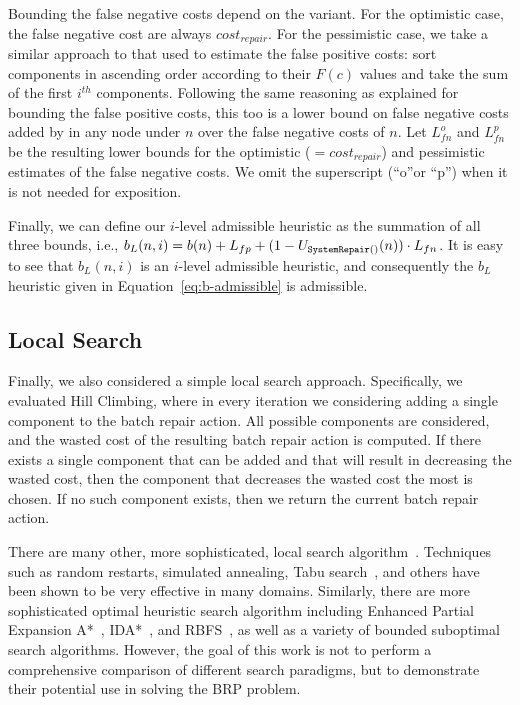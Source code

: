 \documentclass[review]{elsarticle}
\newcommand\sysrep[1]{{\tt SystemRepair(#1)}}
\begin{document}
Bounding the false negative costs depend on the \brps{} variant. For the optimistic case, 
the false negative cost are always $cost_{repair}$. 
For the pessimistic case, we take a similar approach to that used to estimate the false positive costs: 
sort components in ascending order according to their $F(c)$ values and take the sum of the first $i^{th}$ components. Following the same reasoning as explained for bounding the false positive costs, this too is a lower bound on false negative costs added by in any node under $n$ over the false negative costs of $n$. 
Let $L^o_{fn}$ and $L^p_{fn}$ be the resulting lower bounds for the optimistic ($=cost_{repair}$) 
and pessimistic estimates of the false negative costs. We omit the superscript (``o''or ``p'') 
when it is not needed for exposition. 


Finally, we can define our $i$-level admissible heuristic as the summation of all three bounds, 
i.e., $b_L(n,i)=b(n)+L_{fp}+(1-U_{\sysrep{}}(n))\cdot L_{fn}$. 
It is easy to see that $b_L(n,i)$ is an $i$-level admissible heuristic, and consequently 
the $b_L$ heuristic given in Equation~\ref{eq:b-admissible} is admissible. 


\subsection{Local Search}
Finally, we also considered a simple local search approach. 
Specifically, we evaluated Hill Climbing, where in every iteration we considering adding a single component to the batch repair action. All possible components are considered, and the wasted cost of the resulting 
batch repair action is computed. If there exists a single component that can be added and that will result in decreasing the wasted cost, then the component that decreases the wasted cost the most is chosen. 
If no such component exists, then we return the current batch repair action. 


There are many other, more sophisticated, local search algorithm~\cite{lourencco2003iterated}. Techniques such as random restarts, simulated annealing, Tabu search~\cite{glover2013tabu}, and others have been shown to be very effective in many domains. Similarly, there are more sophisticated optimal heuristic search algorithm including Enhanced Partial Expansion A*~\cite{goldenberg2014enanced}, IDA*~\cite{korf1985depth}, and RBFS~\cite{korf1993linear}, as well as a variety of bounded suboptimal search algorithms. However, the goal of this work is not to perform a comprehensive comparison of different search paradigms, but to demonstrate their potential use in solving the BRP problem. 
\end{document}
